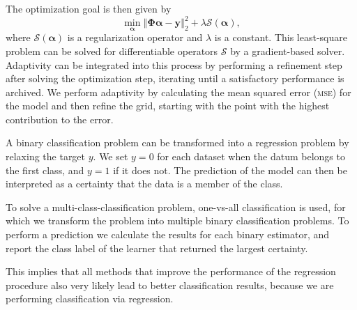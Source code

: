 The optimization goal is then given by
\begin{equation}\label{eq:optGoal}
\min_{\bm{\alpha}} \left\Vert  \bm{\Phi} \bm{\alpha} - \bm{y}   \right\Vert_2^2  + \lambda \mathcal{S}(\bm{\alpha}), 
\end{equation}
where \(\mathcal{S}(\bm{\alpha})\) is a regularization operator and \(\lambda\) is a constant.
This least-square problem can be solved for differentiable operators
\(\mathcal{S}\) by a gradient-based solver.
Adaptivity can be integrated into this process by performing a refinement step
after solving the optimization step, iterating until a satisfactory performance
is archived.
We perform adaptivity by calculating the mean squared error (\textsc{mse}) for the model and then refine
the grid, starting with the point with the highest contribution to the error.

A binary classification problem can be transformed into a regression problem
by relaxing the target \(y\).
We set \(y = 0\) for each dataset when the datum belongs to the first class, and
\(y = 1\) if it does not.
The prediction of the model can then be interpreted as a certainty that the
data is a member of the class.

To solve a multi-class-classification problem, one-vs-all classification is used,
for which we transform the problem into multiple binary classification problems.
To perform a prediction we calculate the results for each binary estimator, and
report the class label of the learner that returned the largest certainty.

This implies that all methods that improve the performance of the regression procedure also very likely lead to better classification results, because we are performing classification via regression.
